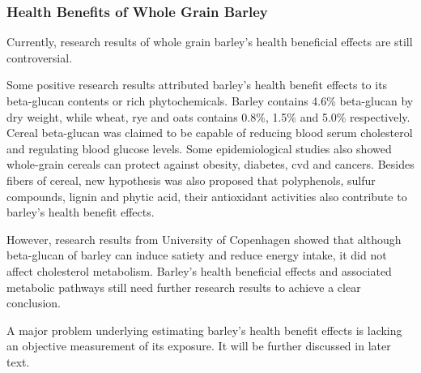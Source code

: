 \subsubsection{Health Benefits of Whole Grain Barley}
Currently, research results of whole grain barley's health beneficial effects are still controversial. 

Some positive research results attributed barley's health benefit effects to its beta-glucan contents or rich phytochemicals. Barley contains 4.6\% beta-glucan by dry weight, while wheat, rye and oats contains 0.8\%, 1.5\% and 5.0\% respectively\cite{frolich2013whole}. Cereal beta-glucan was claimed to be capable of reducing blood serum cholesterol and regulating blood glucose levels\cite{frolich2013whole}. Some epidemiological studies also showed whole-grain cereals can protect against obesity, diabetes, \acrshort{cvd} and cancers\cite{Fardet2010}. Besides fibers of cereal, new hypothesis was also proposed that polyphenols, sulfur compounds, lignin and phytic acid, their antioxidant activities also contribute to barley's health benefit effects\cite{fardet2010}.

However, research results from University of Copenhagen showed that although beta-glucan of barley can induce satiety and reduce energy intake\cite{barleysatiety}, it did not affect cholesterol metabolism\cite{Ibrugger2013}. Barley's health beneficial effects and associated metabolic pathways still need further research results to achieve a clear conclusion.

A major problem underlying estimating barley's health benefit effects is lacking an objective measurement of its exposure. It will be further discussed in later text.


